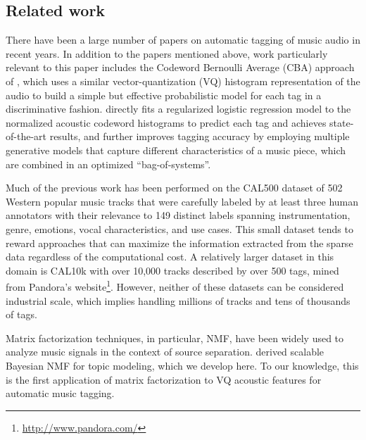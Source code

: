 \subsection{Related work}

There have been a large number of papers on automatic tagging of music audio in recent years.  
In addition to the papers mentioned above, work particularly relevant to this paper includes the Codeword Bernoulli Average (CBA) approach of \citet{hoffman2009easy}, which uses a similar vector-quantization (VQ) histogram representation of the audio to build a simple but effective probabilistic model for each tag in a discriminative fashion. \citet{xie2011music} directly fits a regularized logistic regression model to the normalized acoustic codeword histograms to predict each tag and achieves state-of-the-art results, and \citet{ellis2013bag} further improves tagging accuracy by employing multiple generative models that capture different characteristics of a music piece, which are combined in an optimized ``bag-of-systems''. 

Much of the previous work has been performed on the CAL500 dataset \citep{Turnbull_SemanticAudio} of 502 Western popular music tracks that were carefully labeled by at least three human annotators with their relevance to 149 distinct labels spanning instrumentation, genre, emotions, vocal characteristics, and use cases. This small dataset tends to reward approaches that can maximize the information extracted from the sparse data regardless of the computational cost. A relatively larger dataset in this domain is CAL10k \citep{tingle2010exploring} with over 10,000 tracks described by over 500 tags, mined from Pandora's website\footnote{\url{http://www.pandora.com/}}. However, neither of these datasets can be considered industrial scale, which implies handling millions of tracks and tens of thousands of tags.

Matrix factorization techniques, in particular, \gls{NMF}, have been widely used to analyze music signals \citep{hoffman2010bayesian, liang2013beta} in the context of source separation. \citet{paisley2015handbook} derived scalable Bayesian \gls{NMF} for topic modeling, which we develop here. To our knowledge, this is the first application of matrix factorization to VQ acoustic features for automatic music tagging.

